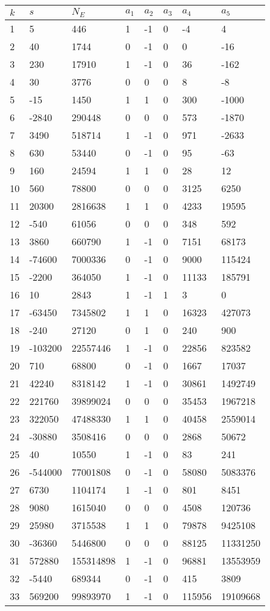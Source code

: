 \documentclass{amsart}
\begin{document}
\begin{longtable}{|l|l|l|lllll|}
\hline
$k$ & $s$ & $N_E$ & $a_1$ & $a_2$ & $a_3$ & $a_4$ & $a_5$\\
\hline
1&5&446&1&-1&0&-4&4\\
2&40&1744&0&-1&0&0&-16\\
3&230&17910&1&-1&0&36&-162\\
4&30&3776&0&0&0&8&-8\\
5&-15&1450&1&1&0&300&-1000\\
6&-2840&290448&0&0&0&573&-1870\\
7&3490&518714&1&-1&0&971&-2633\\
8&630&53440&0&-1&0&95&-63\\
9&160&24594&1&1&0&28&12\\
10&560&78800&0&0&0&3125&6250\\
11&20300&2816638&1&1&0&4233&19595\\
12&-540&61056&0&0&0&348&592\\
13&3860&660790&1&-1&0&7151&68173\\
14&-74600&7000336&0&-1&0&9000&115424\\
15&-2200&364050&1&-1&0&11133&185791\\
16&10&2843&1&-1&1&3&0\\
17&-63450&7345802&1&1&0&16323&427073\\
18&-240&27120&0&1&0&240&900\\
19&-103200&22557446&1&-1&0&22856&823582\\
20&710&68800&0&-1&0&1667&17037\\
21&42240&8318142&1&-1&0&30861&1492749\\
22&221760&39899024&0&0&0&35453&1967218\\
23&322050&47488330&1&1&0&40458&2559014\\
24&-30880&3508416&0&0&0&2868&50672\\
25&40&10550&1&-1&0&83&241\\
26&-544000&77001808&0&-1&0&58080&5083376\\
27&6730&1104174&1&-1&0&801&8451\\
28&9080&1615040&0&0&0&4508&120736\\
29&25980&3715538&1&1&0&79878&9425108\\
30&-36360&5446800&0&0&0&88125&11331250\\
31&572880&155314898&1&-1&0&96881&13553959\\
32&-5440&689344&0&-1&0&415&3809\\
33&569200&99893970&1&-1&0&115956&19109668\\

\end{longtable}
\end{document}
